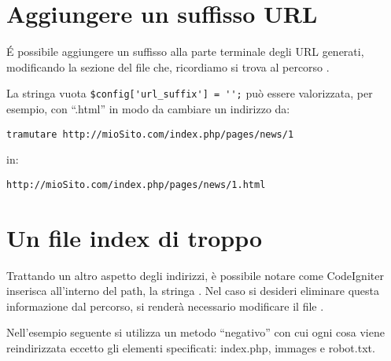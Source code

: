 \section{Aggiungere un suffisso URL}
\'E possibile aggiungere un suffisso alla parte terminale degli \ac{URL} generati, modificando la sezione  del file  che, ricordiamo si trova al percorso  . 

La stringa vuota \verb|$config['url_suffix'] = '';| può essere valorizzata, per esempio, con ``.html'' in modo da cambiare un indirizzo da: 

\verb|tramutare http://mioSito.com/index.php/pages/news/1| 

in:

\verb|http://mioSito.com/index.php/pages/news/1.html|


\section{Un file index di troppo}
Trattando un altro aspetto degli indirizzi, è possibile notare come CodeIgniter inserisca all'interno del path, la stringa . Nel caso si desideri eliminare questa informazione dal percorso, si renderà necessario modificare il file . 

Nell'esempio seguente si utilizza un metodo ``negativo'' con cui ogni cosa viene reindirizzata eccetto gli elementi specificati: index.php, immages e robot.txt.
%
%
%
